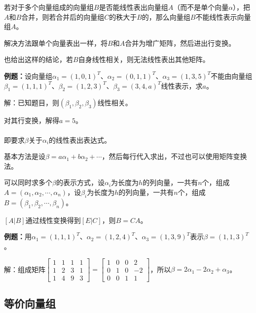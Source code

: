 若对于多个向量组成的向量组$B$是否能线性表出向量组$A$（而不是单个向量$\alpha$），把$A$和$B$合并，则若合并后的向量组$C$的秩大于$B$的，那么向量组$B$不能线性表示向量组$A$。

解决方法跟单个向量表出一样，将$B$和$A$合并为增广矩阵，然后进出行变换。

也给出这样的结论，若$B$自身线性相关，则无法线性表出其他矩阵。

\textbf{例题：}设向量组$\alpha_1=(1,0,1)^T$、$\alpha_2=(0,1,1)^T$、$\alpha_3=(1,3,5)^T$不能由向量组$\beta_1=(1,1,1)^T$、$\beta_2=(1,2,3)^T$、$\beta_3=(3,4,a)^T$线性表示，求$a$。

解：已知题目，则$(\beta_1,\beta_2,\beta_3)$线性相关。

对其行变换，解得$a=5$。

\paragraph{}

即要求$\beta$关于$\alpha_i$的线性表出表达式。

基本方法是设$\beta=a\alpha_1+b\alpha_2+\cdots$，然后每行代入求出，不过也可以使用矩阵变换法。

可以同时求多个$\beta$的表示方式，设$\alpha_i$为长度为$h$的列向量，一共有$n$个，组成$A=(\alpha_1,\alpha_2,\cdots,\alpha_n)$，设$\beta_i$为长度为$h$的列向量，一共有$n$个，组成$B=(\beta_1,\beta_2,\cdots,\beta_n)$。

$[A|B]$通过线性变换得到$[E|C]$，则$B=CA$。

\textbf{例题：}用$\alpha_1=(1,1,1)^T$、$\alpha_2=(1,2,4)^T$、$\alpha_3=(1,3,9)^T$表示$\beta=(1,1,3)^T$。

解：组成矩阵$\left[\begin{array}{cccc}
    1 & 1 & 1 & 1 \\
    1 & 2 & 3 & 1 \\
    1 & 4 & 9 & 3
\end{array}\right]=\left[\begin{array}{cccc}
    1 & 0 & 0 & 2 \\
    0 & 1 & 0 & -2 \\
    0 & 0 & 1 & 1
\end{array}\right]$，所以$\beta=2\alpha_1-2\alpha_2+\alpha_3$。

\subsection{等价向量组}

